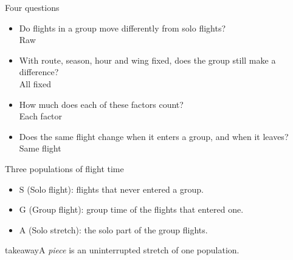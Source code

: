 \documentclass[11pt,aspectratio=169]{beamer}
\newcommand{\Sl}{\mathrm{S}}
\newcommand{\G}{\mathrm{G}}
\newcommand{\A}{\mathrm{A}}
\newcommand{\takeaway}[2][\linewidth]{\par\vfill
  \begin{beamercolorbox}[wd=#1,sep=5pt]{takeaway}\small #2\end{beamercolorbox}}
\newcommand{\tikzfig}[2][0.8\textheight]{%
  \begin{center}\adjustbox{max width=\linewidth,max height=#1}{}\end{center}}
\begin{document}
\begin{frame}[plain]
\end{frame}


\begin{frame}{Four questions}
\begin{itemize}\setlength{\itemsep}{1.0em}\large
  \item[\textcolor{steel}{\Huge\textbf{1}}] Do flights in a group move differently from solo flights?\\{\normalsize\textcolor{steel}{Raw}}
  \item[\textcolor{steel}{\Huge\textbf{2}}] With route, season, hour and wing fixed, does the group still make a difference?\\{\normalsize\textcolor{steel}{All fixed}}
  \item[\textcolor{steel}{\Huge\textbf{3}}] How much does each of these factors count?\\{\normalsize\textcolor{steel}{Each factor}}
  \item[\textcolor{steel}{\Huge\textbf{4}}] Does the same flight change when it enters a group, and when it leaves?\\{\normalsize\textcolor{steel}{Same flight}}
\end{itemize}
\end{frame}

\begin{frame}{Three populations of flight time}
\tikzfig[0.72\textheight]{populations}
\begin{itemize}
  \item[\textcolor{blueI}{$\bullet$}] $\Sl$ (Solo flight): flights that never entered a group.
  \item[\textcolor{orangeJ}{$\bullet$}] $\G$ (Group flight): group time of the flights that entered one.
  \item[\textcolor{aqua}{$\bullet$}] $\A$ (Solo stretch): the solo part of the group flights.
\end{itemize}
\takeaway{A \emph{piece} is an uninterrupted stretch of one population.}
\end{frame}
\end{document}
